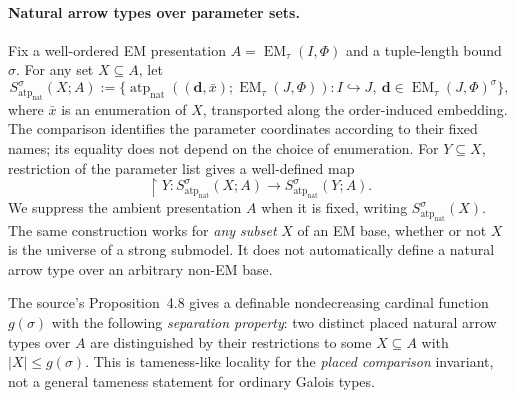 \documentclass[11pt]{article}
\newcommand{\natatp}{\operatorname{atp}_{\mathrm{nat}}}
\newcommand{\EM}{\operatorname{EM}_{\tau}}
\newcommand{\bd}{\mathbf{d}}
\theoremstyle{plain}
\begin{document}
\paragraph{Natural arrow types over parameter sets.}
Fix a well-ordered EM presentation
$A=\EM(I,\Phi)$ and a tuple-length bound $\sigma$.
For any set $X\subseteq A$, let
\[
S^\sigma_{\natatp}(X;A)
:=
\bigl\{\natatp((\bd,\bar x);\EM(J,\Phi)):
 I\hookrightarrow J,\ \bd\in\EM(J,\Phi)^\sigma\bigr\},
\]
where $\bar x$ is an enumeration of $X$,
transported along the order-induced embedding.
The comparison identifies the parameter coordinates
according to their fixed names; its equality does
not depend on the choice of enumeration.
For $Y\subseteq X$, restriction of the parameter list
gives a well-defined map
\[
\restriction Y:
S^\sigma_{\natatp}(X;A)\longrightarrow
S^\sigma_{\natatp}(Y;A).
\]
We suppress the ambient presentation $A$ when it
is fixed, writing $S^\sigma_{\natatp}(X)$.
The same construction works for \emph{any subset}
$X$ of an EM base, whether or not $X$ is the
universe of a strong submodel. It does not
automatically define a natural arrow type
over an arbitrary non-EM base.

The source's Proposition~4.8 gives a definable
nondecreasing cardinal function $g(\sigma)$
with the following \emph{separation property}:
two distinct placed natural arrow types over
$A$ are distinguished by their restrictions
to some $X\subseteq A$ with $|X|\leq g(\sigma)$.
This is tameness-like locality for
the \emph{placed comparison} invariant,
not a general tameness statement for
ordinary Galois types.
\end{document}
